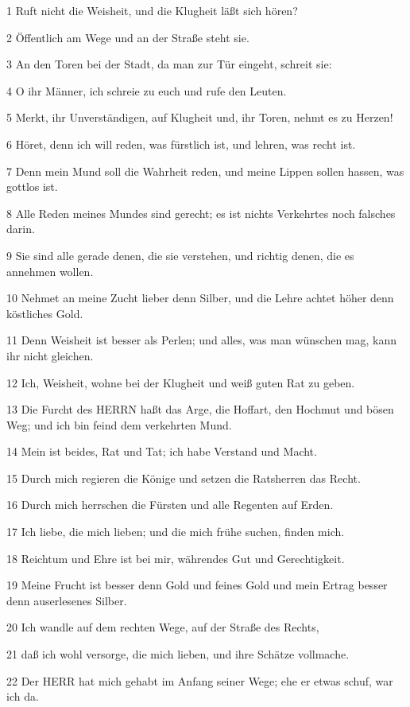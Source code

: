 \par 1 Ruft nicht die Weisheit, und die Klugheit läßt sich hören?
\par 2 Öffentlich am Wege und an der Straße steht sie.
\par 3 An den Toren bei der Stadt, da man zur Tür eingeht, schreit sie:
\par 4 O ihr Männer, ich schreie zu euch und rufe den Leuten.
\par 5 Merkt, ihr Unverständigen, auf Klugheit und, ihr Toren, nehmt es zu Herzen!
\par 6 Höret, denn ich will reden, was fürstlich ist, und lehren, was recht ist.
\par 7 Denn mein Mund soll die Wahrheit reden, und meine Lippen sollen hassen, was gottlos ist.
\par 8 Alle Reden meines Mundes sind gerecht; es ist nichts Verkehrtes noch falsches darin.
\par 9 Sie sind alle gerade denen, die sie verstehen, und richtig denen, die es annehmen wollen.
\par 10 Nehmet an meine Zucht lieber denn Silber, und die Lehre achtet höher denn köstliches Gold.
\par 11 Denn Weisheit ist besser als Perlen; und alles, was man wünschen mag, kann ihr nicht gleichen.
\par 12 Ich, Weisheit, wohne bei der Klugheit und weiß guten Rat zu geben.
\par 13 Die Furcht des HERRN haßt das Arge, die Hoffart, den Hochmut und bösen Weg; und ich bin feind dem verkehrten Mund.
\par 14 Mein ist beides, Rat und Tat; ich habe Verstand und Macht.
\par 15 Durch mich regieren die Könige und setzen die Ratsherren das Recht.
\par 16 Durch mich herrschen die Fürsten und alle Regenten auf Erden.
\par 17 Ich liebe, die mich lieben; und die mich frühe suchen, finden mich.
\par 18 Reichtum und Ehre ist bei mir, währendes Gut und Gerechtigkeit.
\par 19 Meine Frucht ist besser denn Gold und feines Gold und mein Ertrag besser denn auserlesenes Silber.
\par 20 Ich wandle auf dem rechten Wege, auf der Straße des Rechts,
\par 21 daß ich wohl versorge, die mich lieben, und ihre Schätze vollmache.
\par 22 Der HERR hat mich gehabt im Anfang seiner Wege; ehe er etwas schuf, war ich da.
